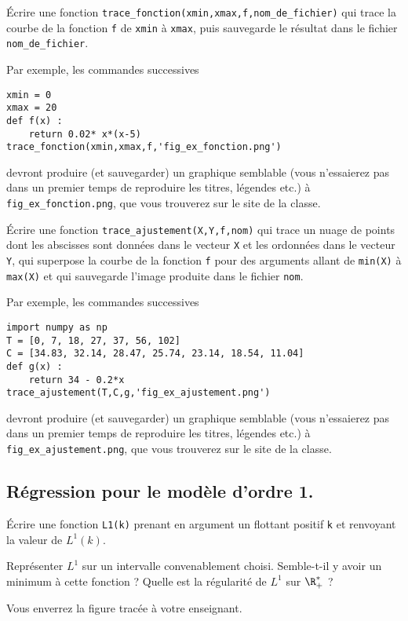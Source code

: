 \question{} \'Ecrire une fonction \texttt{trace\_fonction(xmin,xmax,f,nom\_de\_fichier)} qui trace la courbe de la fonction \texttt{f} de \texttt{xmin} à \texttt{xmax}, puis sauvegarde le résultat dans le fichier \texttt{nom\_de\_fichier}.
  
    Par exemple, les commandes successives
\begin{lstlisting}
xmin = 0
xmax = 20
def f(x) : 
    return 0.02* x*(x-5)
trace_fonction(xmin,xmax,f,'fig_ex_fonction.png')
\end{lstlisting}
 devront produire (et sauvegarder) un graphique semblable (vous n'essaierez pas dans un premier temps de reproduire les titres, légendes etc.) à \texttt{fig\_ex\_fonction.png}, que vous trouverez sur le site de la classe.
    
\question{} \'Ecrire une fonction \texttt{trace\_ajustement(X,Y,f,nom)} qui trace un nuage de points 
dont les abscisses sont données dans le vecteur \texttt{X} et les ordonnées dans le vecteur 
\texttt{Y}, qui superpose la courbe de la fonction \texttt{f} pour des arguments allant de 
\texttt{min(X)} à \texttt{max(X)} et qui sauvegarde l'image produite dans le fichier \texttt{nom}.
    
    Par exemple, les commandes successives 
\begin{lstlisting}
import numpy as np
T = [0, 7, 18, 27, 37, 56, 102]
C = [34.83, 32.14, 28.47, 25.74, 23.14, 18.54, 11.04]
def g(x) : 
    return 34 - 0.2*x
trace_ajustement(T,C,g,'fig_ex_ajustement.png')
\end{lstlisting}
    devront produire (et sauvegarder) un graphique semblable (vous n'essaierez pas dans un premier temps de reproduire les titres, légendes etc.) à \texttt{fig\_ex\_ajustement.png}, que vous trouverez sur le site de la classe.


\subsection*{Régression pour le modèle d'ordre 1.}
\label{sec.reg.o1}


\question{} Écrire une fonction \texttt{L1(k)} prenant en argument un flottant positif \texttt{k} et renvoyant la valeur de $L^1(k)$.

\medskip{}

\question{\label{qu:traceL1}} Représenter $L^1$ sur un intervalle convenablement choisi. Semble-t-il y avoir un minimum à cette fonction ? Quelle est la régularité de $L^1$ sur $\R^\ast_+$ ? 

  Vous enverrez la figure tracée à votre enseignant. 


